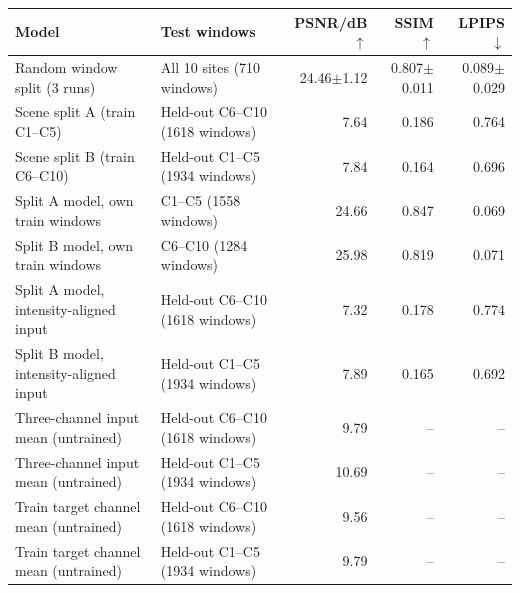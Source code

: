 \begin{tabular}{@{}llrrr@{}}
\toprule
Model & Test windows & PSNR/dB$\uparrow$ & SSIM$\uparrow$ & LPIPS$\downarrow$\\
\midrule
Random window split (3 runs) & All 10 sites (710 windows) & 24.46$\pm$1.12 & 0.807$\pm$0.011 & 0.089$\pm$0.029 \\
\midrule
Scene split A (train C1--C5) & Held-out C6--C10 (1618 windows) & 7.64 & 0.186 & 0.764 \\
Scene split B (train C6--C10) & Held-out C1--C5 (1934 windows) & 7.84 & 0.164 & 0.696 \\
\midrule
Split A model, own train windows & C1--C5 (1558 windows) & 24.66 & 0.847 & 0.069 \\
Split B model, own train windows & C6--C10 (1284 windows) & 25.98 & 0.819 & 0.071 \\
Split A model, intensity-aligned input & Held-out C6--C10 (1618 windows) & 7.32 & 0.178 & 0.774 \\
Split B model, intensity-aligned input & Held-out C1--C5 (1934 windows) & 7.89 & 0.165 & 0.692 \\
\midrule
Three-channel input mean (untrained) & Held-out C6--C10 (1618 windows) & 9.79 & -- & -- \\
Three-channel input mean (untrained) & Held-out C1--C5 (1934 windows) & 10.69 & -- & -- \\
Train target channel mean (untrained) & Held-out C6--C10 (1618 windows) & 9.56 & -- & -- \\
Train target channel mean (untrained) & Held-out C1--C5 (1934 windows) & 9.79 & -- & -- \\
\bottomrule
\end{tabular}
